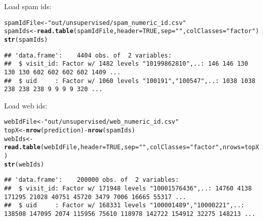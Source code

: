 \documentclass{article}\usepackage[]{graphicx}\usepackage[]{color}
\makeatletter
\newcommand{\hlnum}[1]{\textcolor[rgb]{0.686,0.059,0.569}{#1}}%
\newcommand{\hlstr}[1]{\textcolor[rgb]{0.192,0.494,0.8}{#1}}%
\newcommand{\hlopt}[1]{\textcolor[rgb]{0,0,0}{#1}}%
\newcommand{\hlstd}[1]{\textcolor[rgb]{0.345,0.345,0.345}{#1}}%
\newcommand{\hlkwb}[1]{\textcolor[rgb]{0.69,0.353,0.396}{#1}}%
\newcommand{\hlkwc}[1]{\textcolor[rgb]{0.333,0.667,0.333}{#1}}%
\newcommand{\hlkwd}[1]{\textcolor[rgb]{0.737,0.353,0.396}{\textbf{#1}}}%
\newenvironment{kframe}{%
 \def\at@end@of@kframe{}%
 \ifinner\ifhmode%
  \def\at@end@of@kframe{\end{minipage}}%
  \begin{minipage}{\columnwidth}%
 \fi\fi%
 \def\FrameCommand##1{\hskip\@totalleftmargin \hskip-\fboxsep
 \colorbox{shadecolor}{##1}\hskip-\fboxsep
     \hskip-\linewidth \hskip-\@totalleftmargin \hskip\columnwidth}%
 \MakeFramed {\advance\hsize-\width
   \@totalleftmargin\z@ \linewidth\hsize
   \@setminipage}}%
 {\par\unskip\endMakeFramed%
 \at@end@of@kframe}
\newenvironment{knitrout}{}{} %
\makeatother
\begin{document}
Load spam ids:
\begin{knitrout}
\color{fgcolor}\begin{kframe}
\begin{alltt}
\hlstd{spamIdFile} \hlkwb{<-} \hlstr{"out/unsupervised/spam_numeric_id.csv"}
\hlstd{spamIds} \hlkwb{<-} \hlkwd{read.table}\hlstd{(spamIdFile,} \hlkwc{header}\hlstd{=}\hlnum{TRUE}\hlstd{,} \hlkwc{sep}\hlstd{=}\hlstr{" "}\hlstd{,} \hlkwc{colClasses}\hlstd{=}\hlstr{"factor"}\hlstd{)}
\hlkwd{str}\hlstd{(spamIds)}
\end{alltt}
\begin{verbatim}
## 'data.frame':	4404 obs. of  2 variables:
##  $ visit_id: Factor w/ 1482 levels "10199862810",..: 146 146 130 130 130 602 602 602 602 1409 ...
##  $ uid     : Factor w/ 1060 levels "100191","100547",..: 1038 1038 238 238 238 9 9 9 9 320 ...
\end{verbatim}
\end{kframe}
\end{knitrout}

Load web ids:
\begin{knitrout}
\color{fgcolor}\begin{kframe}
\begin{alltt}
\hlstd{webIdFile} \hlkwb{<-} \hlstr{"out/unsupervised/web_numeric_id.csv"}
\hlstd{topX} \hlkwb{<-} \hlkwd{nrow}\hlstd{(prediction)}\hlopt{-}\hlkwd{nrow}\hlstd{(spamIds)}
\hlstd{webIds} \hlkwb{<-} \hlkwd{read.table}\hlstd{(webIdFile,} \hlkwc{header}\hlstd{=}\hlnum{TRUE}\hlstd{,} \hlkwc{sep}\hlstd{=}\hlstr{" "}\hlstd{,} \hlkwc{colClasses}\hlstd{=}\hlstr{"factor"}\hlstd{,} \hlkwc{nrows}\hlstd{=topX)}
\hlkwd{str}\hlstd{(webIds)}
\end{alltt}
\begin{verbatim}
## 'data.frame':	200000 obs. of  2 variables:
##  $ visit_id: Factor w/ 171948 levels "10001576436",..: 14760 4138 171295 21028 40751 45720 3479 7006 16665 55317 ...
##  $ uid     : Factor w/ 168331 levels "100001489","10000221",..: 138508 147095 2074 115956 75610 118978 142722 154912 32275 148213 ...
\end{verbatim}
\end{kframe}
\end{knitrout}


% 
% 
\end{document}
